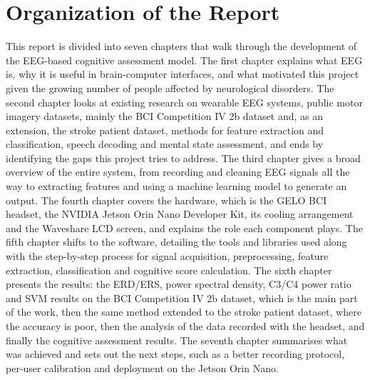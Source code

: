 \section{Organization of the Report}
This report is divided into seven chapters that walk through the development of the EEG-based cognitive assessment model. The first chapter explains what EEG is, why it is useful in brain-computer interfaces, and what motivated this project given the growing number of people affected by neurological disorders. The second chapter looks at existing research on wearable EEG systems, public motor imagery datasets, mainly the BCI Competition IV 2b dataset and, as an extension, the stroke patient dataset, methods for feature extraction and classification, speech decoding and mental state assessment, and ends by identifying the gaps this project tries to address. The third chapter gives a broad overview of the entire system, from recording and cleaning EEG signals all the way to extracting features and using a machine learning model to generate an output. The fourth chapter covers the hardware, which is the GELO BCI headset, the NVIDIA Jetson Orin Nano Developer Kit, its cooling arrangement and the Waveshare LCD screen, and explains the role each component plays. The fifth chapter shifts to the software, detailing the tools and libraries used along with the step-by-step process for signal acquisition, preprocessing, feature extraction, classification and cognitive score calculation. The sixth chapter presents the results: the ERD/ERS, power spectral density, C3/C4 power ratio and SVM results on the BCI Competition IV 2b dataset, which is the main part of the work, then the same method extended to the stroke patient dataset, where the accuracy is poor, then the analysis of the data recorded with the headset, and finally the cognitive assessment results. The seventh chapter summarises what was achieved and sets out the next steps, such as a better recording protocol, per-user calibration and deployment on the Jetson Orin Nano.
